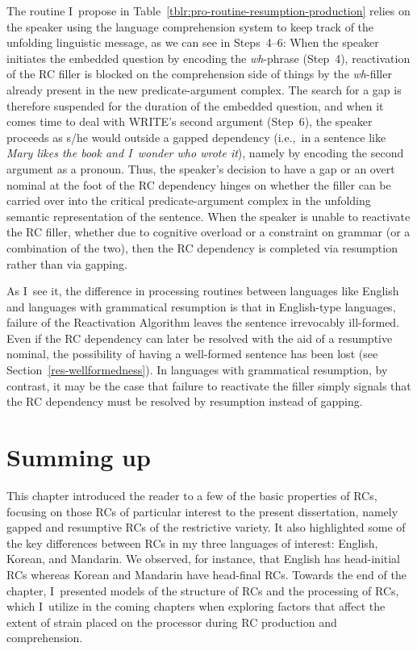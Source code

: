\noindent The routine I~propose in Table~\ref{tblr:pro-routine-resumption-production} relies on the speaker using the language comprehension system to keep track of the unfolding linguistic message, as we can see in Steps~4--6: When the speaker initiates the embedded question by encoding the \textit{wh}-phrase (Step~4), reactivation of the RC filler is blocked on the comprehension side of things by the \textit{wh}-filler already present in the new predicate-argument complex. The search for a gap is therefore suspended for the duration of the embedded question, and when it comes time to deal with WRITE's second argument (Step~6), the speaker proceeds as s/he would outside a gapped dependency (i.e.,~in a sentence like \textit{Mary likes the book and I~wonder who wrote it}), namely by encoding the second argument as a pronoun. Thus, the speaker's decision to have a gap or an overt nominal at the foot of the RC dependency hinges on whether the filler can be carried over into the critical predicate-argument complex in the unfolding semantic representation of the sentence. When the speaker is unable to reactivate the RC filler, whether due to cognitive overload or a constraint on grammar (or a combination of the two), then the RC dependency is completed via resumption rather than via gapping.

As I~see it, the difference in processing routines between languages like English and languages with grammatical resumption is that in English-type languages, failure of the Reactivation Algorithm leaves the sentence irrevocably ill-formed. Even if the RC dependency can later be resolved with the aid of a resumptive nominal, the possibility of having a well-formed sentence has been lost (see Section~\ref{res-wellformedness}). In languages with grammatical resumption, by contrast, it may be the case that failure to reactivate the filler simply signals that the RC dependency must be resolved by resumption instead of gapping.

\section{Summing up}\label{pro-conclusion}

This chapter introduced the reader to a few of the basic properties of RCs, focusing on those RCs of particular interest to the present dissertation, namely gapped and resumptive RCs of the restrictive variety. It also highlighted some of the key differences between RCs in my three languages of interest: English, Korean, and Mandarin. We observed, for instance, that English has head-initial RCs whereas Korean and Mandarin have head-final RCs. Towards the end of the chapter, I~presented models of the structure of RCs and the processing of RCs, which I~utilize in the coming chapters when exploring factors that affect the extent of strain placed on the processor during RC production and comprehension.